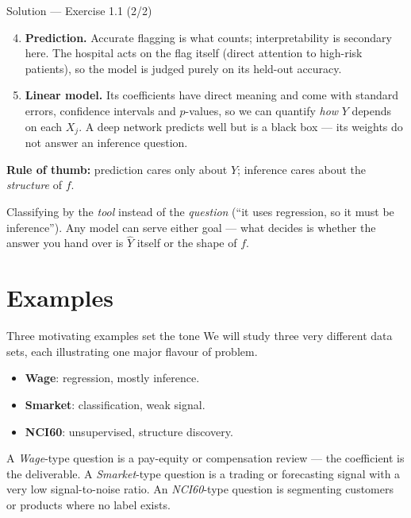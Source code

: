 \documentclass[aspectratio=169,11pt]{beamer}
\begin{document}
\begin{frame}{Solution --- Exercise 1.1 (2/2)}
\begin{solutionbox}
\begin{enumerate}\setcounter{enumi}{3}
  \item \textbf{Prediction.} Accurate flagging is what counts;
        interpretability is secondary here. The hospital acts on the
        flag itself (direct attention to high-risk patients), so the
        model is judged purely on its held-out accuracy.
  \item \textbf{Linear model.} Its coefficients have direct meaning
        and come with standard errors, confidence intervals and
        $p$-values, so we can quantify \emph{how} $Y$ depends on each
        $X_j$. A deep network predicts well but is a black box --- its
        weights do not answer an inference question.
\end{enumerate}
\textbf{Rule of thumb:} prediction cares only about $\hat Y$;
inference cares about the \emph{structure} of $f$.
\end{solutionbox}
\begin{mistake}
Classifying by the \emph{tool} instead of the
\emph{question} (``it uses regression, so it must be inference'').
Any model can serve either goal --- what decides is whether the answer
you hand over is $\hat Y$ itself or the shape of $f$.
\end{mistake}
\end{frame}


\section{Examples}

\begin{frame}{Three motivating examples set the tone}
  We will study three very different data sets, each illustrating one
  major flavour of problem.
  \begin{takeaway}
    \begin{itemize}
      \item \textbf{Wage}: regression, mostly inference.
      \item \textbf{Smarket}: classification, weak signal.
      \item \textbf{NCI60}: unsupervised, structure discovery.
    \end{itemize}
  \end{takeaway}
  \begin{industry}
    A \emph{Wage}-type question is a pay-equity or compensation review --- the coefficient is
    the deliverable. A \emph{Smarket}-type question is a trading or forecasting signal with a
    very low signal-to-noise ratio. An \emph{NCI60}-type question is segmenting customers or
    products where no label exists.
  \end{industry}
\end{frame}
\end{document}
